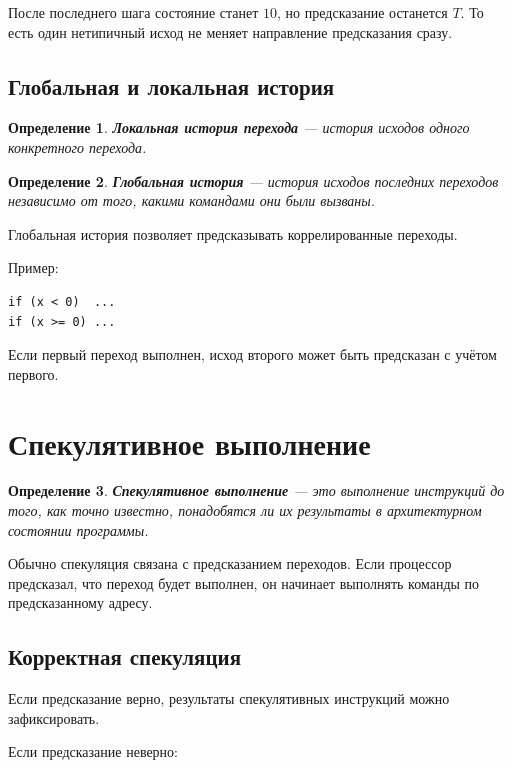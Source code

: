 \documentclass[12pt,a4paper]{article}
\newtheorem{definition}{Определение}
\begin{document}
После последнего шага состояние станет $10$, но предсказание останется $T$.
То есть один нетипичный исход не меняет направление предсказания сразу.

\subsection{Глобальная и локальная история}

\begin{definition}
\textbf{Локальная история перехода} --- история исходов одного конкретного перехода.
\end{definition}

\begin{definition}
\textbf{Глобальная история} --- история исходов последних переходов независимо от того, какими командами они были вызваны.
\end{definition}

Глобальная история позволяет предсказывать коррелированные переходы.

Пример:

\begin{lstlisting}
if (x < 0)  ...
if (x >= 0) ...
\end{lstlisting}

Если первый переход выполнен, исход второго может быть предсказан с учётом первого.

\section{Спекулятивное выполнение}

\begin{definition}
\textbf{Спекулятивное выполнение} --- это выполнение инструкций до того, как точно известно, понадобятся ли их результаты в архитектурном состоянии программы.
\end{definition}

Обычно спекуляция связана с предсказанием переходов. Если процессор предсказал, что переход будет выполнен, он начинает выполнять команды по предсказанному адресу.

\subsection{Корректная спекуляция}

Если предсказание верно, результаты спекулятивных инструкций можно зафиксировать.

Если предсказание неверно:
\end{document}
